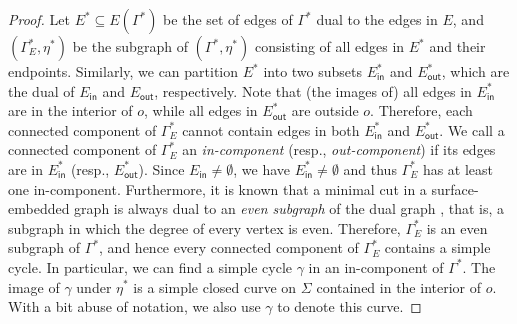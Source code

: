 \documentclass[a4paper,11pt]{article}
\numberwithin{lemma}{section}
\begin{document}
\begin{proof}
Let $E^* \subseteq E(\varGamma^*)$ be the set of edges of $\varGamma^*$ dual to the edges in $E$, and $(\varGamma_E^*,\eta^*)$ be the subgraph of $(\varGamma^*,\eta^*)$ consisting of all edges in $E^*$ and their endpoints.
Similarly, we can partition $E^*$ into two subsets $E_\mathsf{in}^*$ and $E_\mathsf{out}^*$, which are the dual of $E_\mathsf{in}$ and $E_\mathsf{out}$, respectively.
Note that (the images of) all edges in $E_\mathsf{in}^*$ are in the interior of $o$, while all edges in $E_\mathsf{out}^*$ are outside $o$.
Therefore, each connected component of $\varGamma_E^*$ cannot contain edges in both $E_\mathsf{in}^*$ and $E_\mathsf{out}^*$.
We call a connected component of $\varGamma_E^*$ an \emph{in-component} (resp., \emph{out-component}) if its edges are in $E_\mathsf{in}^*$ (resp., $E_\mathsf{out}^*$).
Since $E_\mathsf{in} \neq \emptyset$, we have $E_\mathsf{in}^* \neq \emptyset$ and thus $\varGamma_E^*$ has at least one in-component.
Furthermore, it is known that a minimal cut in a surface-embedded graph is always dual to an \emph{even subgraph} of the dual graph \cite{EricksonFN12}, that is, a subgraph in which the degree of every vertex is even.
Therefore, $\varGamma_E^*$ is an even subgraph of $\varGamma^*$, and hence every connected component of $\varGamma_E^*$ contains a simple cycle.
In particular, we can find a simple cycle $\gamma$ in an in-component of $\varGamma^*$.
The image of $\gamma$ under $\eta^*$ is a simple closed curve on $\varSigma$ contained in the interior of $o$.
With a bit abuse of notation, we also use $\gamma$ to denote this curve.


\end{proof}
\end{document}
